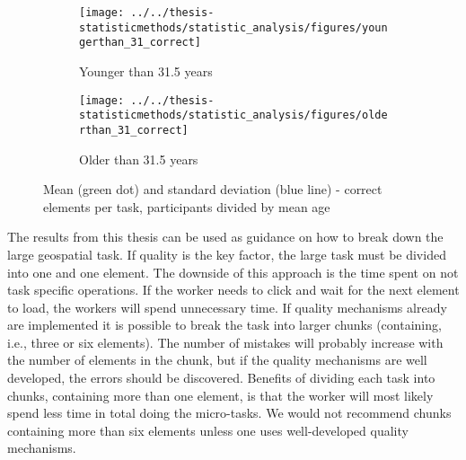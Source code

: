 \begin{figure}[H]
	\centering
	\begin{subfigure}[b]{0.4\textwidth}
		\centering
		\texttt{[image: ../../thesis-statisticmethods/statistic\_analysis/figures/youngerthan\_31\_correct]}
		\caption{Younger than 31.5 years}
		\label{fig:youngerthan31correct}
	\end{subfigure}
	\begin{subfigure}[b]{0.4\textwidth}
		\centering
		\texttt{[image: ../../thesis-statisticmethods/statistic\_analysis/figures/olderthan\_31\_correct]}
		\caption{Older than 31.5 years}
		\label{fig:olderthan31correct}
	\end{subfigure}
	\caption{Mean (green dot) and standard deviation (blue line) - correct elements per task, participants divided by mean age}
	\label{fig:splittedbymeanage}
\end{figure}

The results from this thesis can be used as guidance on how to break down the large geospatial task. If quality is the key factor, the large task must be divided into one and one element. The downside of this approach is the time spent on not task specific operations. If the worker needs to click and wait for the next element to load, the workers will spend unnecessary time. If quality mechanisms already are implemented it is possible to break the task into larger chunks (containing, i.e., three or six elements). The number of mistakes will probably increase with the number of elements in the chunk, but if the quality mechanisms are well developed, the errors should be discovered. Benefits of dividing each task into chunks, containing more than one element, is that the worker will most likely spend less time in total doing the micro-tasks. We would not recommend chunks containing more than six elements unless one uses well-developed quality mechanisms. 




